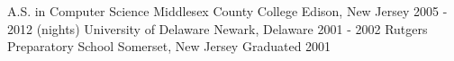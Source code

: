 

\begin{cventries}

  \cventry
    {A.S. in Computer Science} %
    {Middlesex County College} %
    {Edison, New Jersey} %
    {2005 - 2012 (nights)} %
    {}
  \cventry
    {} %
    {University of Delaware} %
    {Newark, Delaware} %
    {2001 - 2002}
    {}
  \cventry
    {} %
    {Rutgers Preparatory School} %
    {Somerset, New Jersey} %
    {Graduated 2001}
    {}



\end{cventries}
